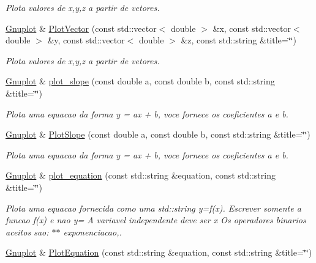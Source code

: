 \begin{DoxyCompactItemize}
\begin{DoxyCompactList}\small\item\em Plota valores de x,y,z a partir de vetores. \end{DoxyCompactList}\item 
\hypertarget{classGnuplot_a239b222cd7ff6ba4a60d583b22248a4f}{\hyperlink{classGnuplot}{Gnuplot} \& \hyperlink{classGnuplot_a239b222cd7ff6ba4a60d583b22248a4f}{Plot\-Vector} (const std\-::vector$<$ double $>$ \&x, const std\-::vector$<$ double $>$ \&y, const std\-::vector$<$ double $>$ \&z, const std\-::string \&title=\char`\"{}\char`\"{})}\label{classGnuplot_a239b222cd7ff6ba4a60d583b22248a4f}

\begin{DoxyCompactList}\small\item\em Plota valores de x,y,z a partir de vetores. \end{DoxyCompactList}\item 
\hypertarget{classGnuplot_a51ea5105eb87285820bb93910f8d346c}{\hyperlink{classGnuplot}{Gnuplot} \& \hyperlink{classGnuplot_a51ea5105eb87285820bb93910f8d346c}{plot\-\_\-slope} (const double a, const double b, const std\-::string \&title=\char`\"{}\char`\"{})}\label{classGnuplot_a51ea5105eb87285820bb93910f8d346c}

\begin{DoxyCompactList}\small\item\em Plota uma equacao da forma y = ax + b, voce fornece os coeficientes a e b. \end{DoxyCompactList}\item 
\hypertarget{classGnuplot_af4c2215781aa7a32ba73caa26941407c}{\hyperlink{classGnuplot}{Gnuplot} \& \hyperlink{classGnuplot_af4c2215781aa7a32ba73caa26941407c}{Plot\-Slope} (const double a, const double b, const std\-::string \&title=\char`\"{}\char`\"{})}\label{classGnuplot_af4c2215781aa7a32ba73caa26941407c}

\begin{DoxyCompactList}\small\item\em Plota uma equacao da forma y = ax + b, voce fornece os coeficientes a e b. \end{DoxyCompactList}\item 
\hyperlink{classGnuplot}{Gnuplot} \& \hyperlink{classGnuplot_a42dfb8c9d4636745c7be277ed818e849}{plot\-\_\-equation} (const std\-::string \&equation, const std\-::string \&title=\char`\"{}\char`\"{})
\begin{DoxyCompactList}\small\item\em Plota uma equacao fornecida como uma std\-::string y=f(x). Escrever somente a funcao f(x) e nao y= A variavel independente deve ser x Os operadores binarios aceitos sao\-: $\ast$$\ast$ exponenciacao,. \end{DoxyCompactList}\item 
\hypertarget{classGnuplot_a901b030726d78e791f7005acf987bc44}{\hyperlink{classGnuplot}{Gnuplot} \& \hyperlink{classGnuplot_a901b030726d78e791f7005acf987bc44}{Plot\-Equation} (const std\-::string \&equation, const std\-::string \&title=\char`\"{}\char`\"{})}\label{classGnuplot_a901b030726d78e791f7005acf987bc44}


\end{DoxyCompactItemize}
